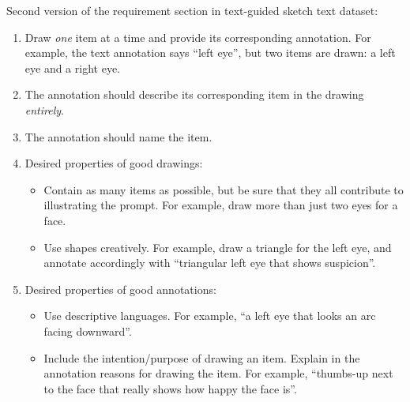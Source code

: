 


Second version of the requirement section in text-guided sketch text dataset:
\begin{enumerate}
\item Draw \textit{one} item at a time and provide its corresponding annotation. For example, the text annotation says ``left eye'', but two items are drawn: a left eye and a right eye.
\item The annotation should describe its corresponding item in the drawing \textit{entirely}.
\item The annotation should name the item.
\item Desired properties of good drawings:
\begin{itemize}
    \item Contain as many items as possible, but be sure that they all contribute to illustrating the prompt. For example, draw more than just two eyes for a face.
    \item Use shapes creatively. For example, draw a triangle for the left eye, and annotate accordingly with ``triangular left eye that shows suspicion''.
\end{itemize}
\item Desired properties of good annotations:
\begin{itemize}
    \item Use descriptive languages. For example, ``a left eye that looks an arc facing downward''.
    \item Include the intention/purpose of drawing an item. Explain in the annotation reasons for drawing the item. For example, ``thumbs-up next to the face that really shows how happy the face is''.
\end{itemize}
\end{enumerate}

